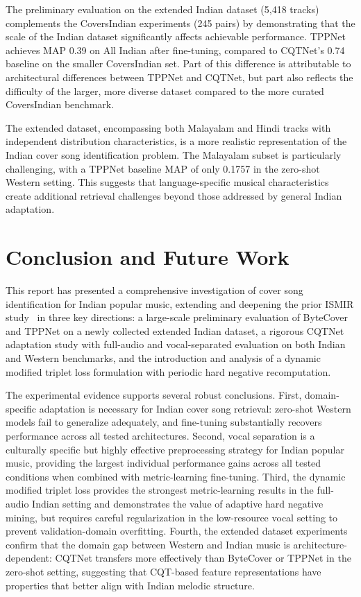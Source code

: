 \documentclass[conference]{IEEEtran}
\begin{document}
The preliminary evaluation on the extended Indian dataset (5,418 tracks) complements the CoversIndian experiments (245 pairs) by demonstrating that the scale of the Indian dataset significantly affects achievable performance. TPPNet achieves MAP 0.39 on All Indian after fine-tuning, compared to CQTNet's 0.74 baseline on the smaller CoversIndian set. Part of this difference is attributable to architectural differences between TPPNet and CQTNet, but part also reflects the difficulty of the larger, more diverse dataset compared to the more curated CoversIndian benchmark.

The extended dataset, encompassing both Malayalam and Hindi tracks with independent distribution characteristics, is a more realistic representation of the Indian cover song identification problem. The Malayalam subset is particularly challenging, with a TPPNet baseline MAP of only 0.1757 in the zero-shot Western setting. This suggests that language-specific musical characteristics create additional retrieval challenges beyond those addressed by general Indian adaptation.

\section{Conclusion and Future Work}

This report has presented a comprehensive investigation of cover song identification for Indian popular music, extending and deepening the prior ISMIR study~\cite{ismir_paper} in three key directions: a large-scale preliminary evaluation of ByteCover and TPPNet on a newly collected extended Indian dataset, a rigorous CQTNet adaptation study with full-audio and vocal-separated evaluation on both Indian and Western benchmarks, and the introduction and analysis of a dynamic modified triplet loss formulation with periodic hard negative recomputation.

The experimental evidence supports several robust conclusions. First, domain-specific adaptation is necessary for Indian cover song retrieval: zero-shot Western models fail to generalize adequately, and fine-tuning substantially recovers performance across all tested architectures. Second, vocal separation is a culturally specific but highly effective preprocessing strategy for Indian popular music, providing the largest individual performance gains across all tested conditions when combined with metric-learning fine-tuning. Third, the dynamic modified triplet loss provides the strongest metric-learning results in the full-audio Indian setting and demonstrates the value of adaptive hard negative mining, but requires careful regularization in the low-resource vocal setting to prevent validation-domain overfitting. Fourth, the extended dataset experiments confirm that the domain gap between Western and Indian music is architecture-dependent: CQTNet transfers more effectively than ByteCover or TPPNet in the zero-shot setting, suggesting that CQT-based feature representations have properties that better align with Indian melodic structure.
\end{document}
